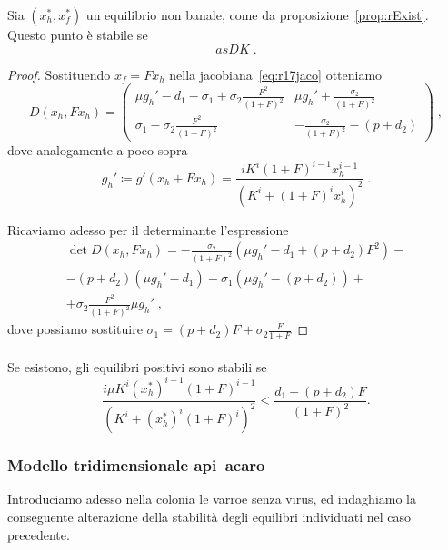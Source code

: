 \begin{proposizione}
    Sia $(x_h^*, x_f^*)$ un equilibrio non banale, come da proposizione~\ref{prop:rExist}.
    Questo punto è stabile se
    $$asDK \; .$$
\end{proposizione}
\begin{proof}
    Sostituendo $x_f = F x_h$ nella jacobiana~\eqref{eq:r17jaco} otteniamo
    \begin{equation}
    D(x_h, F x_h) =
    \begin{pmatrix}
        \mu g_h' -d_1 - \sigma_1 + \sigma_2 \frac{F^2}{(1+F)^2}
        & \mu g_h' + \frac{\sigma_2}{(1+F)^2}
        \\
        \sigma_1 - \sigma_2 \frac{F^2}{(1+F)^2}
        & - \frac{\sigma_2}{(1+F)^2} - (p+d_2)
    \end{pmatrix} \; ,
    \label{eq:r17jacoFxh}
\end{equation}
dove analogamente a poco sopra
$$g_h' \coloneq g'( x_h + F x_h ) = \frac{i K^i {(1+F)}^{i-1} x_h^{i-1} }{ { \left( K^i + {(1+F)}^i x_h^i
        \right)  }^2 } \; .$$

Ricaviamo adesso per il determinante l'espressione
\begin{multline}
    \det D(x_h, F x_h) = - \frac{\sigma_2}{ {(1+F)}^2 } \left( \mu g_h' -d_1 + (p+d_2) F^2 \right) - \\
    - (p+d_2) (\mu g_h' -d_1) -\sigma_1 \left( \mu g_h' -(p+d_2) \right) + \\
    + \sigma_2 \frac{F^2}{{(1+F)}^2} \mu g_h' %
    \; ,
\end{multline}
dove possiamo sostituire $\sigma_1 = (p+d_2)F + \sigma_2 \frac{F}{1+F}$


\end{proof}



\paragraph{}
Se esistono, gli equilibri positivi sono stabili se
\begin{equation}
\frac{i \mu K^i {(x_h^*)}^{i-1} {(1+F)}^{i-1}}{ {\left( K^i + {(x_h^*)}^i {(1+F)}^i \right)}^2 }
<
\frac{d_1 + (p+d_2) F}{{(1+F)}^2}.
\label{eq:rattiRidotto1stabilitySECONDOLORO}
\end{equation}

\subsubsection{Modello tridimensionale api--acaro}
Introduciamo adesso nella colonia le varroe senza virus, ed indaghiamo la conseguente alterazione della stabilità degli equilibri individuati nel caso precedente.

